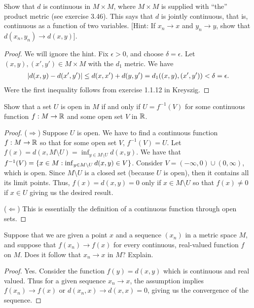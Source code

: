\begin{exercise}{34}
Show that $d$ is continuous in $M \times M$, where $M \times M$ is supplied with ``the'' product metric (see exercise 3.46).
This says that $d$ is jointly continuous, that is, continuous as a function of two variables.
[Hint: If $x_n \to x$ and $y_n \to y$, show that $d(x_n,y_n) \to d(x,y)$].
\end{exercise}
\begin{proof}
We will ignore the hint.
Fix $\epsilon>0$, and choose $\delta=\epsilon$.
Let $(x,y),(x',y')\in M\times M$ with the $d_1$ metric.
We have 
\begin{align*}
    \left\lvert d(x,y)-d(x',y')\right\rvert
    \leq d(x,x')+d(y,y') 
    = d_1((x,y),(x',y')) < \delta = \epsilon.
\end{align*}
Were the first inequality follows from exercise 1.1.12 in Kreyszig.
\end{proof} 

\begin{exercise}{35}
Show that a set $U$ is open in $M$ if and only if $U=f^{-1}(V)$ for some continuous function $f: M \to \mathbb{R}$ and some open set $V$ in $\mathbb{R}$.
\end{exercise}
\begin{proof}
($\Rightarrow$)
Suppose $U$ is open.
We have to find a continuous function $f:M\to\mathbb{R}$ so that for some open set $V$, $f^{-1}(V)=U$.
Let $f(x) = d(x,M\setminus U) = \inf_{y\in M\setminus U}d(x,y)$.
We have that $f^{-1}(V) = \{x\in M: \inf_{y\in M\setminus U}d(x,y)\in V\}$.
Consider $V=(-\infty,0)\cup(0,\infty)$, which is open.
Since $M\setminus U$ is a closed set (because $U$ is open), then it contains all its limit points.
Thus, $f(x)=d(x,y)=0$ only if $x\in M\setminus U$ so that $f(x)\neq 0$ if $x\in U$ giving us the desired result.

($\Leftarrow$)
This is essentially the definition of a continuous function through open sets.
\end{proof} 

\begin{exercise}{36}
Suppose that we are given a point $x$ and a sequence $(x_n)$ in a metric space $M$, and suppose that $f(x_n) \to f(x)$ for every continuous, real-valued function $f$ on $M$.
Does it follow that $x_n \to x$ in $M$?
Explain.
\end{exercise}
\begin{proof}
Yes.
Consider the function $f(y)=d(x,y)$ which is continuous and real valued.
Thus for a given sequence $x_n\to x$, the assumption implies $f(x_n)\to f(x)$ or $d(x_n,x) \to d(x,x) =0$, giving us the convergence of the sequence.
\end{proof} 
